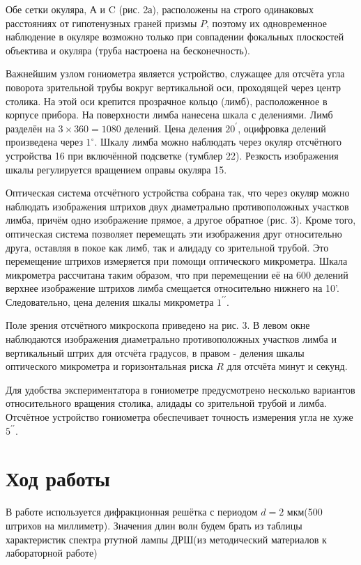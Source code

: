 \documentclass[a4paper,12pt]{article} %
\begin{document}
Обе сетки окуляра, А и C (рис. 2а), расположены на строго одинаковых расстояниях от гипотенузных граней призмы $P$, поэтому их одновременное наблюдение в окуляре возможно только при совпадении фокальных плоскостей объектива и окуляра (труба настроена на бесконечность).

Важнейшим узлом гониометра является устройство, служащее для отсчёта угла поворота зрительной трубы вокруг вертикальной оси, проходящей через центр столика. На этой оси крепится прозрачное кольцо (лимб), расположенное в корпусе прибора. На поверхности лимба нанесена шкала с делениями. Лимб разделён на $3 \times 360=1080$ делений. Цена деления $20^{\prime}$, оцифровка делений произведена через $1^{\circ}$. Шкалу лимба можно наблюдать через окуляр отсчётного устройства 16 при включённой подсветке (тумблер 22). Резкость изображения шкалы регулируется вращением оправы окуляра 15.

Оптическая система отсчётного устройства собрана так, что через окуляр можно наблюдать изображения штрихов двух диаметрально противоположных участков лимба, причём одно изображение прямое, а другое обратное (рис. 3). Кроме того, оптическая система позволяет перемещать эти изображения друг относительно друга, оставляя в покое как лимб, так и алидаду со зрительной трубой. Это перемещение штрихов измеряется при помощи оптического микрометра. Шкала микрометра рассчитана таким образом, что при перемещении её на 600 делений верхнее изображение штрихов лимба смещается относительно нижнего на 10'. Следовательно, цена деления шкалы микрометра $1^{\prime \prime}$.

Поле зрения отсчётного микроскопа приведено на рис. 3. В левом окне наблюдаются изображения диаметрально противоположных участков лимба и вертикальный штрих для отсчёта градусов, в правом - деления шкалы оптического микрометра и горизонтальная риска $R$ для отсчёта минут и секунд.

Для удобства экспериментатора в гониометре предусмотрено несколько вариантов относительного вращения столика, алидады со зрительной трубой и лимба.
Отсчётное устройство гониометра обеспечивает точность измерения угла не хуже $5^{\prime \prime}$.

\section{Ход работы}
В работе используется дифракционная решётка с периодом $d = 2$ мкм(500 штрихов на миллиметр). Значения длин волн будем брать из таблицы характеристик спектра ртутной лампы ДРШ(из методический материалов к лабораторной работе)
\end{document}
